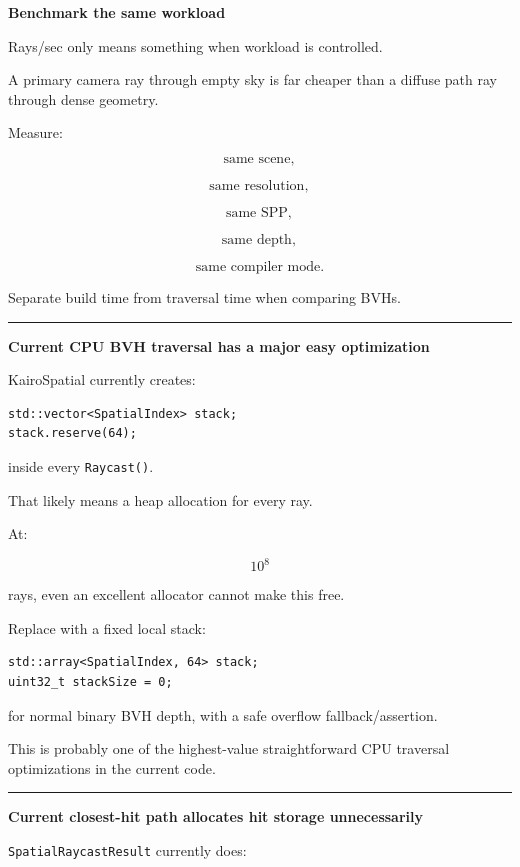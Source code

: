 \textbf{Benchmark the same workload}

Rays/sec only means something when workload is controlled.

A primary camera ray through empty sky is far cheaper than a diffuse path ray through dense geometry.

Measure:

\[
\text{same scene},
\]

\[
\text{same resolution},
\]

\[
\text{same SPP},
\]

\[
\text{same depth},
\]

\[
\text{same compiler mode}.
\]

Separate build time from traversal time when comparing BVHs.

\begin{center}\rule{0.5\linewidth}{0.5pt}\end{center}

\textbf{Current CPU BVH traversal has a major easy optimization}

KairoSpatial currently creates:

\begin{verbatim}
std::vector<SpatialIndex> stack;
stack.reserve(64);
\end{verbatim}

inside every \texttt{Raycast()}.

That likely means a heap allocation for every ray.

At:

\[
10^8
\]

rays, even an excellent allocator cannot make this free.

Replace with a fixed local stack:

\begin{verbatim}
std::array<SpatialIndex, 64> stack;
uint32_t stackSize = 0;
\end{verbatim}

for normal binary BVH depth, with a safe overflow fallback/assertion.

This is probably one of the highest-value straightforward CPU traversal optimizations in the current code.

\begin{center}\rule{0.5\linewidth}{0.5pt}\end{center}

\textbf{Current closest-hit path allocates hit storage unnecessarily}

\texttt{SpatialRaycastResult} currently does:

